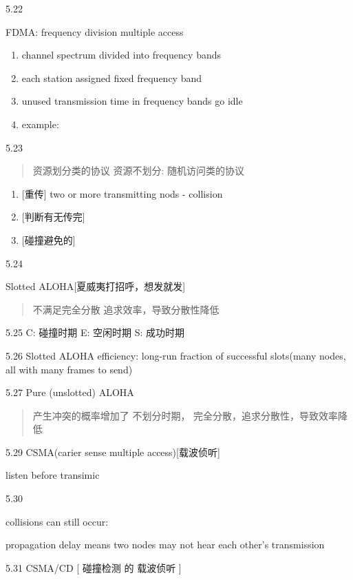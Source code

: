 \documentclass[
]{article}
\begin{document}
5.22

FDMA: frequency division multiple access

\begin{enumerate}
\def\labelenumi{\arabic{enumi}.}
\item
  channel spectrum divided into frequency bands
\item
  each station assigned fixed frequency band
\item
  unused transmission time in frequency bands go idle
\item
  example:
\end{enumerate}

5.23

\begin{quote}
资源划分类的协议 资源不划分: 随机访问类的协议
\end{quote}

\begin{enumerate}
\def\labelenumi{\arabic{enumi}.}
\item
  {[}重传{]} two or more transmitting nods - collision
\item
  {[}判断有无传完{]}
\item
  {[}碰撞避免的{]}
\end{enumerate}

5.24

Slotted ALOHA{[}夏威夷打招呼，想发就发{]}

\begin{quote}
不满足完全分散 追求效率，导致分散性降低
\end{quote}

5.25 C: 碰撞时期 E: 空闲时期 S: 成功时期

5.26 Slotted ALOHA efficiency: long-run fraction of successful
slots(many nodes, all with many frames to send)

5.27 Pure (unslotted) ALOHA

\begin{quote}
产生冲突的概率增加了 不划分时期， 完全分散，追求分散性，导致效率降低
\end{quote}

5.29 CSMA(carier sense multiple access){[}载波侦听{]}

listen before transimic

5.30

collisions can still occur:

propagation delay means two nodes may not hear each other's transmission

5.31 CSMA/CD {[} 碰撞检测 的 载波侦听 {]}
\end{document}
